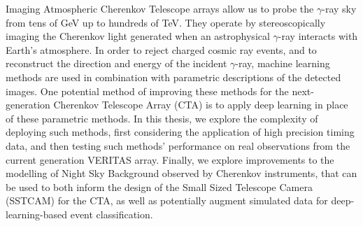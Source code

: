 Imaging Atmospheric Cherenkov Telescope arrays allow us to probe the $\gamma$-ray sky from tens of GeV up to hundreds of TeV. They operate by stereoscopically imaging the Cherenkov light generated when an astrophysical $\gamma$-ray interacts with Earth's atmosphere. In order to reject charged cosmic ray events, and to reconstruct the direction and energy of the incident $\gamma$-ray, machine learning methods are used in combination with parametric descriptions of the detected images. One potential method of improving these methods for the next-generation Cherenkov Telescope Array (CTA) is to apply deep learning in place of these parametric methods. In this thesis, we explore the complexity of deploying such methods, first considering the application of high precision timing data, and then testing such methods' performance on real observations from the current generation VERITAS array. Finally, we explore improvements to the modelling of Night Sky Background observed by Cherenkov instruments, that can be used to both inform the design of the Small Sized Telescope Camera (SSTCAM) for the CTA, as well as potentially augment simulated data for deep-learning-based event classification.